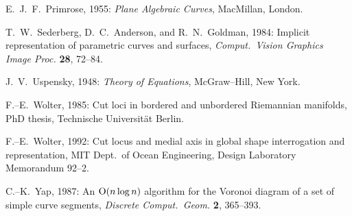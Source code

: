\begin{thebibliography}{99}
E.~J.~F.~Primrose, 1955: {\it Plane Algebraic Curves}, MacMillan, London.

T.~W.~Sederberg, D.~C.~Anderson, and R.~N.~Goldman, 1984: Implicit
\linebreak representation of parametric curves and surfaces, {\it
Comput.\ Vision Graphics Image Proc.} {\bf 28}, 72--84.

J.~V.~Uspensky, 1948: {\it Theory of Equations}, McGraw--Hill,
New York.

F.--E.~Wolter, 1985: Cut loci in bordered and unbordered
Riemannian manifolds, PhD thesis, Technische Universit\"at Berlin.

F.--E.~Wolter, 1992: Cut locus and medial axis in global shape
interrogation and representation, MIT Dept.\ of Ocean Engineering,
Design Laboratory Memorandum 92--2.

C.--K.~Yap, 1987: An ${\rm O}(n\log n)$ algorithm for the Voronoi
diagram of a set of simple curve segments, {\it Discrete Comput.\
Geom.} {\bf 2}, 365--393.

\end{thebibliography}




